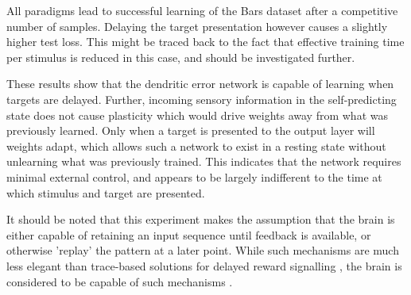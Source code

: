 All paradigms lead to successful learning of the Bars dataset after a competitive number of samples. Delaying the target
presentation however causes a slightly higher test loss. This might be traced back to the fact that effective training
time per stimulus is reduced in this case, and should be investigated further. 


These results show that the dendritic error network is capable of learning when targets are delayed. Further, incoming
sensory information in the self-predicting state does not cause plasticity which would drive weights away from what was
previously learned. Only when a target is presented to the output layer will weights adapt, which allows such a network
to exist in a resting state without unlearning what was previously trained. This indicates that the network requires
minimal external control, and appears to be largely indifferent to the time at which stimulus and target are presented.

It should be noted that this experiment makes the assumption that the brain is either capable of retaining an input
sequence until feedback is available, or otherwise 'replay' the pattern at a later point. While such mechanisms are much
less elegant than trace-based solutions for delayed reward signalling \citep{bellec2020solution}, the brain is
considered to be capable of such mechanisms \citep{Marblestone2016}.


